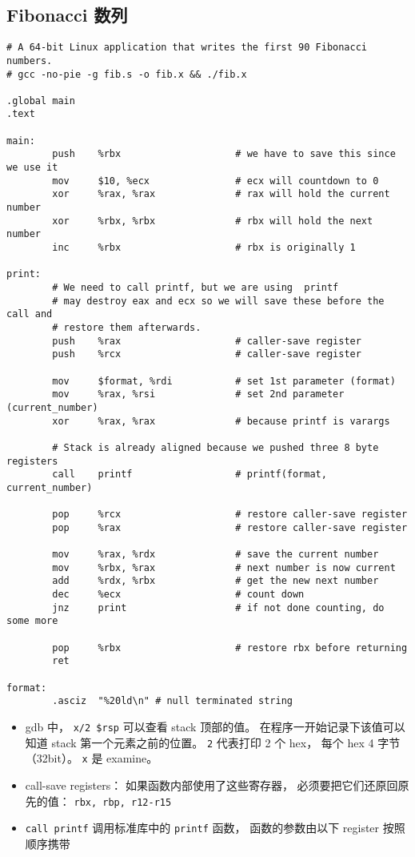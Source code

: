 \subsection{Fibonacci 数列}
\begin{lstlisting}[language=none, caption=fib.s]
# A 64-bit Linux application that writes the first 90 Fibonacci numbers.
# gcc -no-pie -g fib.s -o fib.x && ./fib.x

.global main
.text

main:
        push    %rbx                    # we have to save this since we use it
        mov     $10, %ecx               # ecx will countdown to 0
        xor     %rax, %rax              # rax will hold the current number
        xor     %rbx, %rbx              # rbx will hold the next number
        inc     %rbx                    # rbx is originally 1

print:
        # We need to call printf, but we are using  printf
        # may destroy eax and ecx so we will save these before the call and
        # restore them afterwards.
        push    %rax                    # caller-save register
        push    %rcx                    # caller-save register

        mov     $format, %rdi           # set 1st parameter (format)
        mov     %rax, %rsi              # set 2nd parameter (current_number)
        xor     %rax, %rax              # because printf is varargs

        # Stack is already aligned because we pushed three 8 byte registers
        call    printf                  # printf(format, current_number)

        pop     %rcx                    # restore caller-save register
        pop     %rax                    # restore caller-save register

        mov     %rax, %rdx              # save the current number
        mov     %rbx, %rax              # next number is now current
        add     %rdx, %rbx              # get the new next number
        dec     %ecx                    # count down
        jnz     print                   # if not done counting, do some more

        pop     %rbx                    # restore rbx before returning
        ret

format:
        .asciz  "%20ld\n" # null terminated string
\end{lstlisting}

\begin{itemize}
\item gdb 中， \verb|x/2 $rsp| 可以查看 stack 顶部的值。 在程序一开始记录下该值可以知道 stack 第一个元素之前的位置。 \verb|2| 代表打印 2 个 hex， 每个 hex 4 字节（32bit）。 \verb|x| 是 examine。
\item call-save registers： 如果函数内部使用了这些寄存器， 必须要把它们还原回原先的值： \verb|rbx, rbp, r12-r15|
\item \verb|call printf| 调用标准库中的 \verb|printf| 函数， 函数的参数由以下 register 按照顺序携带
\end{itemize}
